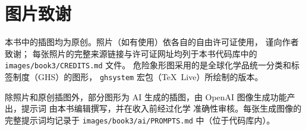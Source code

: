\chapter*{图片致谢}

本书中的插图均为原创。照片（如有使用）依各自的自由许可证使用，
谨向作者致谢；
每张照片的完整来源链接与许可证网址均列于本书代码库中的
\texttt{images/book3/CREDITS.md} 文件。
危险象形图采用的是全球化学品统一分类和标签制度（GHS）的图形，
\texttt{ghsystem} 宏包（\TeX\ Live）所绘制的版本。

\bigskip
除照片和原创插图外，部分图形为
AI 生成的插图，由 OpenAI 图像生成功能产出，提示词
由本书编辑撰写，并在收入前经过化学
准确性审核。每张生成图像的完整提示词均记录于
\texttt{images/book3/ai/PROMPTS.md} 中（位于代码库内）。

